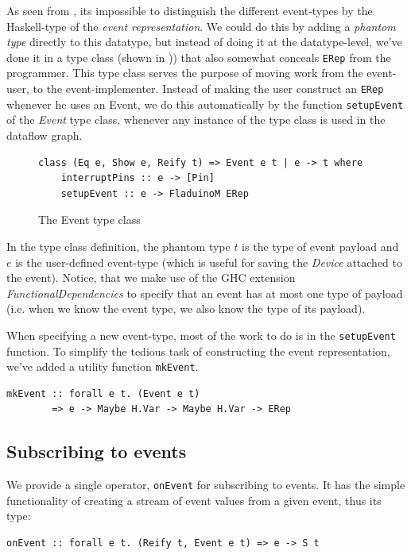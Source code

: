 \documentclass[a4paper, oneside, final]{memoir}
\let\fref\undefined
\begin{document}
As seen from \fref[plain]{fig:Erep}, its impossible to distinguish the
different event-types by the Haskell-type of the \textit{event
  representation}. We could do this by adding a \textit{phantom type}
directly to this datatype, but instead of doing it at the
datatype-level, we've done it in a type class (shown in
\fref{fig:Event type class})) that also somewhat conceals \verb|ERep| from
the programmer. This type class serves the purpose of moving work from
the event-user, to the event-implementer. Instead of making the user
construct an \verb|ERep| whenever he uses an Event, we do this
automatically by the function \verb|setupEvent| of the \textit{Event}
type class, whenever any instance of the type class is used in the
dataflow graph.

\begin{figure}
\centering
 \begin{verbatim}
class (Eq e, Show e, Reify t) => Event e t | e -> t where
    interruptPins :: e -> [Pin]
    setupEvent :: e -> FladuinoM ERep
\end{verbatim}
\caption{The Event type class}
\label{fig:Event type class}
\end{figure}

In the type class definition, the phantom type $t$ is the type of
event payload and $e$ is the user-defined event-type (which is useful
for saving the \textit{Device} attached to the event). Notice, that we
make use of the GHC extension \textit{FunctionalDependencies} to
specify that an event has at most one type of payload (i.e. when
we know the event type, we also know the type of its payload).

When specifying a new event-type, most of the work to do is in the
\verb|setupEvent| function. To simplify the tedious task
of constructing the event representation, we've added a utility
function \verb|mkEvent|. 
\begin{verbatim}
mkEvent :: forall e t. (Event e t) 
        => e -> Maybe H.Var -> Maybe H.Var -> ERep
\end{verbatim}

\subsection{Subscribing to events}
We provide a single operator, \verb|onEvent| for subscribing to
events. It has the simple functionality of creating a stream of event
values from a given event, thus its type:

\begin{verbatim}
onEvent :: forall e t. (Reify t, Event e t) => e -> S t
\end{verbatim}
\end{document}
